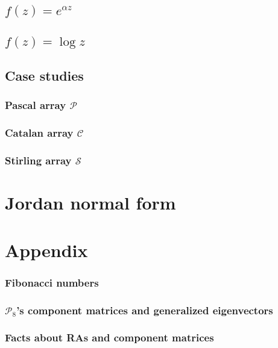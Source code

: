 

\subsection{$f(z)=e^{\alpha z}$}



\subsection{$f(z)=\log{z}$}



\subsection{Case studies}

\subsubsection{Pascal array $\mathcal{P}$}



\subsubsection{Catalan array $\mathcal{C}$}



\subsubsection{Stirling array $\mathcal{S}$}




\section{Jordan normal form}



\section{Appendix}

\subsubsection{Fibonacci numbers}



\subsubsection{$\mathcal{P}_{8}$'s component matrices and generalized eigenvectors}



\subsubsection{Facts about RAs and component matrices}






